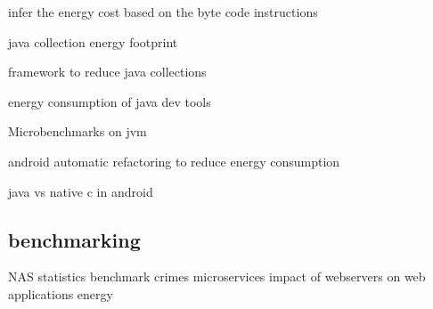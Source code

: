 infer the energy cost based on the byte code instructions \cite{ma2017biogeography}

java collection energy footprint


framework to reduce java collections \cite{manotas2014seeds}

energy consumption of java dev tools \cite{baskar2013experimental}

Microbenchmarks on jvm \cite{longo2019reducing} \cite{baskar2013experimental}

android automatic refactoring to reduce energy consumption \cite{banerjee2016automated} \cite{rodriguez2017reducing}

java vs native c in android \cite{corral2014method}





\subsection{benchmarking}
NAS \cite{bailey_nas_nodate}
statistics \cite{he_statistics-based_2019}
benchmark crimes \cite{van_der_kouwe_benchmarking_2018}
microservices \cite{grambow_benchmarking_2020}
impact of webservers on web applications energy \cite{manotas_investigating_2013}




\cite{marathe2017empirical}



